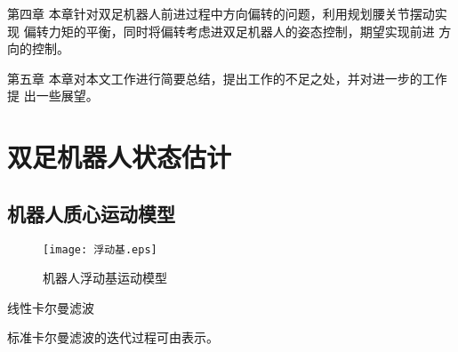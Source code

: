 第四章 本章针对双足机器人前进过程中方向偏转的问题，利用规划腰关节摆动实现
偏转力矩的平衡，同时将偏转考虑进双足机器人的姿态控制，期望实现前进
方向的控制。

第五章 本章对本文工作进行简要总结，提出工作的不足之处，并对进一步的工作提
出一些展望。
\chapter{双足机器人状态估计}
\section{机器人质心运动模型}
\begin{figure}[htbp]
    \centering
    \texttt{[image: 浮动基.eps]}
    \caption{\label{fig:zju-logo}机器人浮动基运动模型}
\end{figure}

\begin{algorithm}[htbp] 
\caption{线性卡尔曼滤波} 
\label{alg:KF} 
\begin{algorithmic}[1] %

\end{algorithmic}
\end{algorithm}
标准卡尔曼滤波的迭代过程可由表示。

